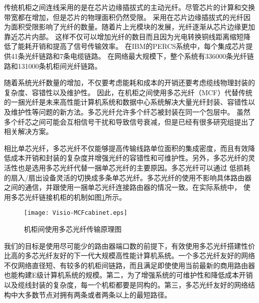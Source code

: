 传统机柜之间连线采用的是在芯片边缘插拔式的主动光纤。尽管芯片的计算和交换带宽都在增加，但是芯片的物理面积仍然受限。
采用在芯片边缘插拔式的光纤因为面积受限影响了光纤的数量。随着片上光模块的发展，光纤逐渐从芯片边缘更加靠近芯片内部。
这样不仅可以增加光纤的数目而且因为光电转换铜线距离缩短降低了能耗开销和提高了信号传输效率。
在IBM的PERCS系统中，每个集成芯片提供41条光纤链路和7条电缆链路。
在网络最大规模下，整个系统有336000条光纤链路和131000条机柜间光纤链路。


随着系统光纤数量的增加，不仅要考虑能耗和成本的开销还要考虑缆线物理封装的复杂度、容错性以及维护性。
因此，在机柜之间使用多芯光纤（MCF）代替传统的一捆光纤是未来高性能计算机系统和数据中心系统解决大量光纤封装、容错性以及维护性等问题的新方法。多芯光纤允许多个纤芯被封装在同一个包层中。
虽然多个纤芯之间可能会互相信号干扰和导致信号衰减，但是已经有很多研究组提出了相关解决方案。

 相比单芯光纤，多芯光纤不仅能够提高传输线路单位面积的集成密度，而且有效降低成本开销和封装的复杂度并增强光纤的容错性和可维护性。另外，多芯光纤的灵活性也是选用多芯光纤代替一捆单芯光纤的主要原因。多芯光纤可以通过
 低损耗的扇入/扇出设备灵活的切换成多条单芯光纤。多芯光纤的使用不影响具体路由器之间的通信，并跟使用一捆单芯光纤连接路由器的情况一致。在实际系统中，
 使用多芯光纤链接机柜的机制如图\ref{mcfcabinet}所示。

 \begin{figure}[t]
  \centering
    \texttt{[image: Visio-MCFcabinet.eps]}
  \caption{机柜间使用多芯光纤传输原理图}
  \label{mcfcabinet}
\end{figure}

我们的目标是使用尽可能少的路由器端口数的前提下，有效使用多芯光纤搭建性价比高的多芯光纤友好的下一代大规模高性能计算机系统。一个多芯光纤友好的网络不仅网络直径短、有较多的机柜间链路，而且满足即使使用当前最新的商用路由器也能构建E级计算机系统的规模。第二，为了增强系统的可维护性和降低成本开销以及缆线封装的复杂度，每一个机柜都要是同构的。第三，多芯光纤友好的网络结构中大多数节点对拥有两条或者两条以上的最短路径。

